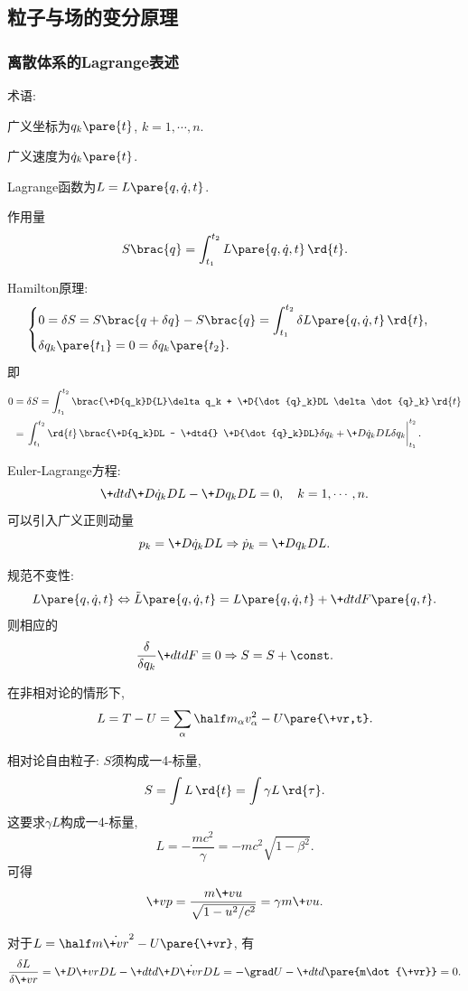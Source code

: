 \documentclass[hidelinks]{ctexart}
\begin{document}
\subsection{粒子与场的变分原理} %
\label{sub:粒子与场的变分原理}

\subsubsection{离散体系的Lagrange表述} %
\label{ssub:离散体系的lagrange表述}

\begin{cenum}
    \item 术语:
    \begin{cenum}
        \item 广义坐标为$q_k\pare{t}$, $k=1,\cdots,n$.
        \item 广义速度为$\dot{q}_k\pare{t}$.
        \item Lagrange函数为$L = L\pare{q,\dot{q},t}$.
        \item 作用量
        \[ S\brac{q} = \int_{t_1}^{t_2}L\pare{q,\dot{q},t}\,\rd{t}. \]
    \end{cenum}
    \item Hamilton原理:
    \[ \begin{cases}
        \displaystyle 0 = \delta S = S\brac{q+\delta q} - S\brac{q} = \int_{t_1}^{t_2} \delta L\pare{q,\dot{q},t}\,\rd{t}, \\
        \displaystyle \delta q_k\pare{t_1} = 0 = \delta q_k\pare{t_2}.
    \end{cases} \]
    即
    \begin{align*}
        0 &= \delta S = \int_{t_1}^{t_2} \brac{\+D{q_k}D{L}\delta q_k + \+D{\dot{q}_k}DL \delta\dot{q}_k}\,\rd{t} \\
        &= \left.\int_{t_1}^{t_2} \rd{t}\, \brac{\+D{q_k}DL - \+dtd{} \+D{\dot{q}_k}DL} \delta q_k + \+D{\dot{q}_k}D{L}\delta q_k\right\vert_{t_1}^{t_2}.
    \end{align*}
    \item Euler-Lagrange方程:
    \[ \+dtd{} \+D{\dot{q}_k}DL - \+D{q_k}D{L} = 0,\quad k = 1,\cdots,n. \]
    可以引入广义正则动量
    \[ p_k = \+D{\dot{q}_k}DL \Rightarrow \dot{p}_k = \+D{q_k}DL. \]
    \item 规范不变性:
    \[ L\pare{q,\dot{q},t} \Leftrightarrow \tilde{L}\pare{q,\dot{q},t} = L\pare{q,\dot{q},t} + \+dtd{F\pare{q,t}}. \]
    则相应的
    \[ \frac{\delta}{\delta q_k}\+dtd{F} \equiv 0 \Rightarrow S = S+\const. \]
    \item 在非相对论的情形下,
    \[ L = T-U = \sum_\alpha \half m_\alpha v_\alpha^2 - U\pare{\+vr,t}. \]
    \item 相对论自由粒子: $S$须构成一4-标量,
    \[ S = \int L\,\rd{t} = \int \gamma L \,\rd{\tau}. \]
    这要求$\gamma L$构成一4-标量,
    \[ L = -\frac{mc^2}{\gamma} = -mc^2 \sqrt{1-\beta^2}. \]
    可得
    \[ \+vp = \frac{m\+vu}{\sqrt{1-u^2/c^2}} = \gamma m\+vu. \]
\end{cenum}
\begin{ex}
    对于$\displaystyle L = \half m\dot{\+vr}^2 - U\pare{\+vr}$, 有
    \[ \frac{\delta L}{\delta \+vr} = \+D{\+vr}D{L} - \+dtd{} \+D{\dot{\+vr}}DL = -\grad U - \+dtd{}\pare{m\dot{\+vr}} = 0. \]
\end{ex}
\end{document}
